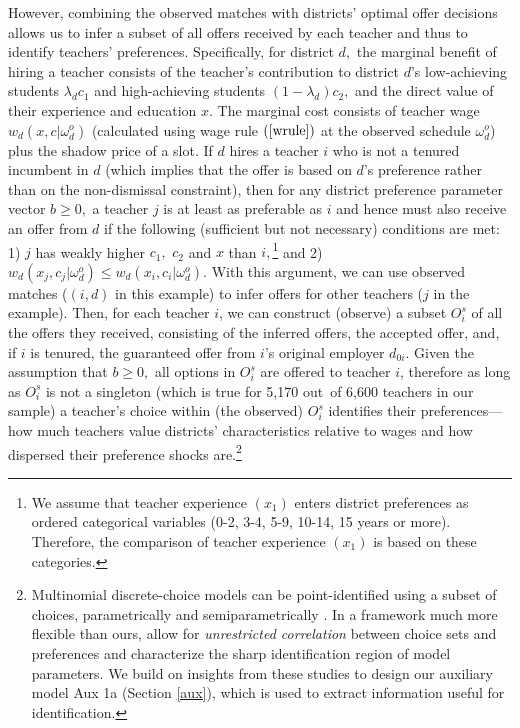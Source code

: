 \documentclass[notitlepage,12pt]{article}%
\begin{document}
However, combining the observed matches with districts' optimal offer
decisions allows us to infer a subset of all offers received by each teacher
and thus to identify teachers' preferences. Specifically, for district $d,$
the marginal benefit of hiring a teacher consists of the teacher's
contribution to district $d$'s low-achieving students $\lambda_{d}c_{1}$ and
high-achieving students $\left(  1-\lambda_{d}\right)  c_{2},$ and the direct
value of their experience and education $x.$ The marginal cost consists of
teacher wage $w_{d}\left(  x,c|\omega_{d}^{o}\right)  $ (calculated using wage
rule $\left(  \ref{wrule}\right)  $ at the observed schedule $\omega_{d}^{o}$)
plus the shadow price of a slot. If $d$ hires a teacher $i$ who is not a
tenured incumbent in $d$ (which implies that the offer is based on $d$'s
preference rather than on the non-dismissal constraint), then for any district
preference parameter vector $b\geq0,$ a teacher $j$ is at least as preferable
as $i$ and hence must also receive an offer from $d$ if the following
(sufficient but not necessary) conditions are met: 1) $j$ has weakly higher
$c_{1},$ $c_{2}$ and $x$ than $i,$\footnote{We assume that teacher experience
$\left(  x_{1}\right)  $ enters district preferences as ordered categorical
variables (0-2, 3-4, 5-9, 10-14, 15 years or more). Therefore, the comparison
of teacher experience $\left(  x_{1}\right)  $ is based on these categories.}
and 2) $w_{d}\left(  x_{j},c_{j}|\omega_{d}^{o}\right)  \leq w_{d}\left(
x_{i},c_{i}|\omega_{d}^{o}\right)  $. With this argument, we can use observed
matches ($\left(  i,d\right)  $ in this example) to infer offers for other
teachers ($j$ in the example). Then, for each teacher $i$, we can construct
(observe) a subset $O_{i}^{s}$ of all the offers they received, consisting of
the inferred offers, the accepted offer, and, if $i$ is tenured, the
guaranteed offer from $i$'s original employer $d_{0i}$. Given the assumption
that $b\geq0,$ all options in $O_{i}^{s}$ are offered to teacher $i$,
therefore as long as $O_{i}^{s}$ is not a singleton (which is true for 5,170
out\ of 6,600 teachers in our sample) a teacher's choice within (the observed)
$O_{i}^{s}$ identifies their preferences--- how much teachers value districts'
characteristics relative to wages and how dispersed their preference shocks
are.\footnote{Multinomial discrete-choice models can be point-identified using
a subset of choices, parametrically \citep[e.g.,][]{mcfadden1977modelling} and
semiparametrically \citep[e.g.,][]{fox2007semiparametric}. In a framework much
more flexible than ours, \citet{barseghyan2021heterogeneous} allow for
\emph{unrestricted correlation} between choice sets and preferences and
characterize the sharp identification region of model parameters. We build on
insights from these studies to design our auxiliary model Aux 1a (Section
\ref{aux}), which is used to extract information useful for identification.}
\end{document}
